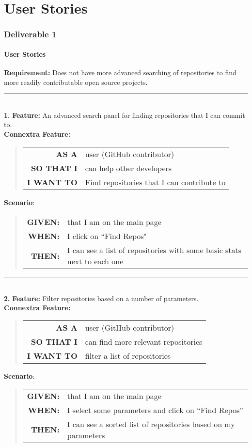 \documentclass[12pt]{article}
\newcommand{\Requirement}[1] {
   \noindent \textbf{Requirement:} #1
}
\newcommand{\Feature}[1]{ 
   \noindent \textbf{Feature:} #1
}
\newcommand{\CFeature}[4]{
\noindent \textbf{Connextra Feature:}
	\begin{quote}
	\begin{tabular}{rl}
	\textbf{AS A} & #1\\
	\textbf{SO THAT \uppercase{#2}} & #3\\
	\textbf{\uppercase{#2} WANT TO} & #4  
	\end{tabular}
	\end{quote}
}
\newcommand{\GivenSc} {
	\noindent \textbf{GIVEN:}
	}
\newcommand{\WhenSc} {
	\noindent \textbf{WHEN:}
	}
\newcommand{\AndSc} {
	\noindent \textbf{AND:}
	}
\newcommand{\ThenSc} {
	\noindent \textbf{THEN:}
	}
\begin{document}


\pagebreak
\setcounter{part}{1}
\setcounter{section}{1}
\setcounter{subsection}{0}
\part{User Stories}
\section*{Deliverable 1}
\subsection{User Stories}


\begin{framed}
\Requirement{Does not have more advanced searching of repositories to find more readily contributable open source projects.}\\[0.2cm]

\hrule~\\

\noindent  \textbf{1.}\Feature{An advanced search panel for finding repositories that I can commit to.}\\[0.2cm]


\CFeature{user (\textsf{GitHub} contributor)}{I}{can help other developers}{Find repositories that I can contribute to}

\noindent \textbf{Scenario}:
\begin{quote}
\begin{tabular}{rl}
\GivenSc & that I am on the main page\\
\WhenSc & I click on ``Find Repos"\\
\ThenSc & I can see a list of repositories with some basic stats next to each one
\end{tabular}
\end{quote}

\hrule~\\

\noindent  \textbf{2.}\Feature{Filter repositories based on a number of parameters.}\\[0.2cm]

\CFeature{user (\textsf{GitHub} contributor)}{I}{can find more relevant repositories}{filter a list of repositories}

\noindent \textbf{Scenario}:
\begin{quote}
\begin{tabular}{rl}
\GivenSc & that I am on the main page\\
\WhenSc & I select some parameters and click on ``Find Repos''\\
\ThenSc & I can see a sorted list of repositories based on my parameters
\end{tabular}
\end{quote}
\end{framed}
\end{document}

